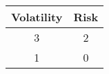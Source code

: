 \begin{tabular}{|c|c|}
\hline
Volatility  & Risk \\
\hline
 3  &   2   \\
 1  &   0   \\
\hline
\end{tabular}

